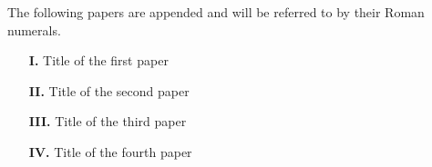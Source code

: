 
The following papers are appended and will be referred to by their Roman numerals.

\begin{enumerate}
\setlength{\itemsep}{5mm}
\item[\textbf{I.}] Title of the first  paper 
\item[\textbf{II.}] Title of the second paper 
\item[\textbf{III.}] Title of the third  paper 
\item[\textbf{IV.}] Title of the fourth paper 
\end{enumerate}
